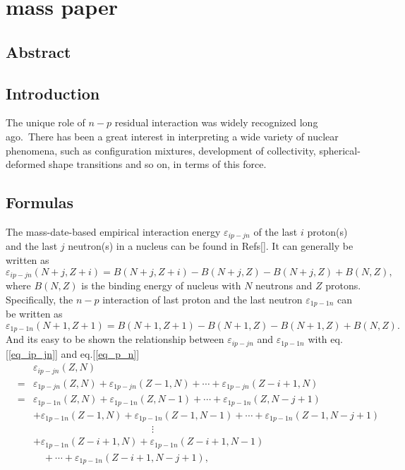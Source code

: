 \chapter{mass paper}
\section{Abstract}
\section{Introduction}
The unique role of $n-p$ residual interaction was widely recognized long ago.~There has been a great interest in interpreting a wide variety of nuclear phenomena, such as configuration mixtures, development of collectivity, spherical-deformed shape transitions and so on, in terms of this force. 
\section{Formulas}
The mass-date-based empirical interaction energy $\varepsilon_{ip-jn}$ of the last $i$ proton(s) and the last $j$ neutron(s) in a nucleus can be found in Refs[]. It can generally be written as
\begin{equation}\label{eq_ip_jn}
\varepsilon_{ip-jn}(N+j,Z+i)=B(N+j,Z+i)-B(N+j,Z)-B(N+j,Z)+B(N,Z),
\end{equation}
where $B(N,Z)$ is the binding energy of nucleus with $N$ neutrons and $Z$ protons. Specifically, the $n-p$ interaction of last proton and the last neutron $\varepsilon_{1p-1n}$ can be written as
\begin{equation}\label{eq_p_n}
\varepsilon_{1p-1n}(N+1,Z+1)=B(N+1,Z+1)-B(N+1,Z)-B(N+1,Z)+B(N,Z).
\end{equation}
And its easy to be shown the relationship between $\varepsilon_{ip-jn}$ and $\varepsilon_{1p-1n}$ with eq.[\ref{eq_ip_jn}] and eq.[\ref{eq_p_n}]
\begin{eqnarray}
  &\ &\varepsilon_{ip-jn}(Z,N)\nonumber\\
  &=&\varepsilon_{1p-jn}(Z,N)+\varepsilon_{1p-jn}(Z-1,N)+\cdots+\varepsilon_{1p-jn}(Z-i+1,N)\nonumber\\
  &=&\varepsilon_{1p-1n}(Z,N)+\varepsilon_{1p-1n}(Z,N-1)+\cdots+\varepsilon_{1p-1n}(Z,N-j+1)\nonumber\\
  &\ &+\varepsilon_{1p-1n}(Z-1,N)+\varepsilon_{1p-1n}(Z-1,N-1)+\cdots+\varepsilon_{1p-1n}(Z-1,N-j+1)\nonumber\\
  &\ &\qquad\qquad\qquad\qquad\qquad\qquad\vdots\nonumber\\
  &\ &+\varepsilon_{1p-1n}(Z-i+1,N)+\varepsilon_{1p-1n}(Z-i+1,N-1)\nonumber\\
  &\ &\quad+\cdots+\varepsilon_{1p-1n}(Z-i+1,N-j+1),\label{eq_relat}
\end{eqnarray}
